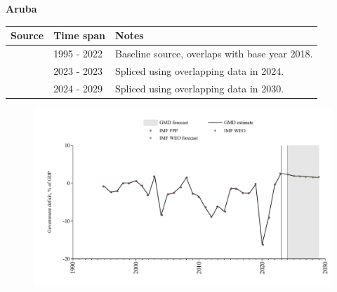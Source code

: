 \documentclass[12pt,a4paper,landscape]{article}
\begin{document}
\begin{adjustbox}{max totalsize={\paperwidth}{\paperheight},center}
\begin{minipage}[t][\textheight][t]{\textwidth}
\vspace*{0.5cm}
{}
\begin{center}
{\Large\bfseries Aruba}
\end{center}
\vspace{0.5cm}
\begin{table}[H]
\centering
\small
\begin{tabular}{|l|l|l|}
\hline
\textbf{Source} & \textbf{Time span} & \textbf{Notes} \\
\hline
\rowcolor{white}\cite{IMF_WEO}& 1995 - 2022 &Baseline source, overlaps with base year 2018.\\
\rowcolor{lightgray}\cite{IMF_FPP}& 2023 - 2023 &Spliced using overlapping data in 2024.\\
\rowcolor{white}\cite{IMF_WEO_forecast}& 2024 - 2029 &Spliced using overlapping data in 2030.\\
\hline
\end{tabular}
\end{table}
\begin{figure}[H]
\centering
\includegraphics[width=\textwidth,height=0.6\textheight,keepaspectratio]{graphs/ABW_govdef_GDP.pdf}
\end{figure}
\end{minipage}
\end{adjustbox}
\end{document}
